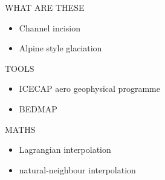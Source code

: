     WHAT ARE THESE
    \begin{itemize}
    \item{Channel incision}
    \item{Alpine style glaciation}
    \end{itemize}
    \vspace{1cm}
    TOOLS
    {\small \begin{itemize}
    \item{ICECAP aero geophysical programme}
    \item{BEDMAP}
    \end{itemize}
    }
    \vspace{1cm}
    MATHS
    {\small \begin{itemize}
    \item{Lagrangian interpolation}
    \item{natural-neighbour interpolation}
    \end{itemize}
    }



